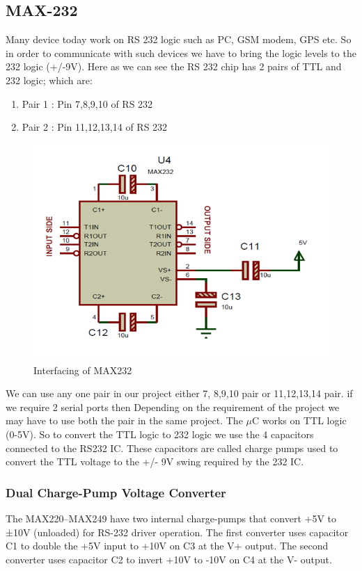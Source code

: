 \documentclass[12pt,a4paper,oneside,openright]{report}
\begin{document}
\subsection{MAX-232}
Many device today work on RS 232 logic such as PC, GSM modem, GPS etc.  So in order to communicate with such devices we have to bring the logic levels to the 232 logic (+/-9V). Here as we can see the RS 232 chip has 2 pairs of TTL and 232 logic; which are:
\begin{enumerate}
 \item Pair 1 : Pin 7,8,9,10 of RS 232
\item Pair 2 : Pin 11,12,13,14  of RS 232
\end{enumerate}
\begin{figure}[!h]
 \centering
 \includegraphics[width = \textwidth]{Figures/22.jpg}
 \caption{Interfacing  of MAX232}
 \label{Interfacing  of MAX232}
\end{figure}
We can use any one pair in our project either 7, 8,9,10 pair or 11,12,13,14 pair. if we require 2 serial ports then Depending on the requirement of the project we may have to use both the pair in the same project. The $\mu$C works on TTL logic (0-5V). So to convert the TTL logic to 232 logic we use the 4 capacitors connected to the RS232 IC. These capacitors are called charge pumps used to convert the TTL voltage to the +/- 9V swing required by the 232 IC.

\subsubsection{Dual Charge-Pump Voltage Converter}
The MAX220–MAX249 have two internal charge-pumps that convert +5V to ±10V (unloaded) for RS-232 driver operation. The first converter uses capacitor C1 to double the +5V input to +10V on C3 at the V+ output. The second converter uses capacitor C2 to invert +10V to -10V on C4 at the V- output.
\end{document}
